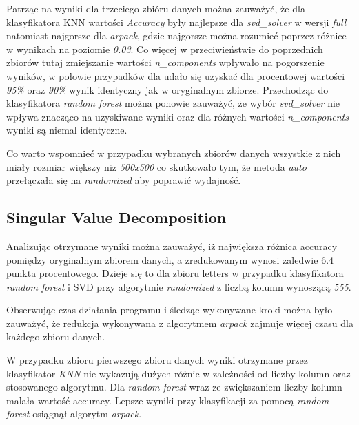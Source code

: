 \documentclass{classrep}
\begin{document}
{{            Patrząc na wyniki dla trzeciego zbióru danych \cite{dataset_documents}
            można zauważyć, że dla klasyfikatora KNN wartości \textit{Accuracy} były
            najlepsze dla \textit{svd\_solver} w wersji \textit{full} natomiast najgorsze
            dla \textit{arpack}, gdzie najgorsze można rozumieć poprzez różnice w
            wynikach na poziomie \textit{0.03}. Co więcej w przeciwieństwie do
            poprzednich zbiorów tutaj zmiejszanie wartości \textit{n\_components} wpływało
            na pogorszenie wyników, w połowie przypadków dla udało się uzyskać dla
            procentowej wartości \textit{95\%} oraz \textit{90\%} wynik identyczny jak
            w oryginalnym zbiorze. Przechodząc do klasyfikatora \textit{random forest}
            można ponowie zauważyć, że wybór \textit{svd\_solver} nie wpływa znacząco
            na uzyskiwane wyniki oraz dla różnych wartości \textit{n\_components}
            wyniki są niemal identyczne.

            Co warto wspomnieć w przypadku wybranych zbiorów danych wszystkie z nich
            miały rozmiar większy niz \textit{500x500} co skutkowało tym, że metoda
            \textit{auto} przełączała się na \textit{randomized} aby poprawić wydajność.

        }

        \subsection{Singular Value Decomposition} {
            Analizując otrzymane wyniki można zauważyć, iż największa różnica accuracy pomiędzy oryginalnym zbiorem danych, a zredukowanym wynosi zaledwie 6.4 punkta procentowego. Dzieje się to dla zbioru letters w przypadku klasyfikatora \textit{random forest} i SVD przy algorytmie \textit{randomized} z liczbą kolumn wynoszącą \textit{555}.
            
            Obserwując czas działania programu i śledząc wykonywane kroki można było zauważyć, że redukcja wykonywana z algorytmem \textit{arpack} zajmuje więcej czasu dla każdego zbioru danych.
            
            W przypadku zbioru pierwszego zbioru danych \cite{dataset_letters} wyniki otrzymane przez klasyfikator \textit{KNN} nie wykazują dużych różnic w zależności od liczby kolumn oraz stosowanego algorytmu. Dla \textit{random forest} wraz ze zwiększaniem liczby kolumn malała wartość accuracy. Lepsze wyniki przy klasyfikacji za pomocą \textit{random forest} osiągnął algorytm \textit{arpack}.
            
}}
\end{document}
